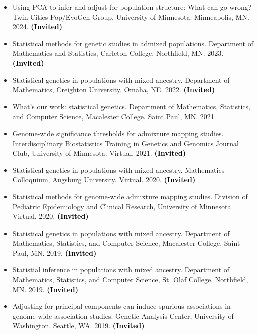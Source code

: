 \documentclass[margin]{res}
\newcommand{\annotate}[1]{\textcolor{black}{\textbf{(#1)}}}
\begin{document}
\begin{resume}
\begin{itemize}
\item[24.] Using PCA to infer and adjust for population structure: What can go wrong? 
Twin Cities Pop/EvoGen Group, University of Minnesota. Minneapolis, MN. 2024. 
\annotate{Invited}

\item[23.] Statistical methods for genetic studies in admixed populations. 
Department of Mathematics and Statistics, Carleton College. Northfield, MN. 2023. 
\annotate{Invited}

\item[22.] Statistical genetics in populations with mixed ancestry. 
Department of Mathematics, Creighton University. Omaha, NE. 2022. 
\annotate{Invited}

\item[21.] What's our work: statistical genetics. 
Department of Mathematics, Statistics, and Computer Science, Macalester College. Saint Paul, MN. 2021.

\item[20.] Genome-wide significance thresholds for admixture mapping studies.
Interdisciplinary Biostatistics Training in Genetics and Genomics Journal Club, University of Minnesota. Virtual. 2021. 
\annotate{Invited}

\item[19.] Statistical genetics in populations with mixed ancestry. 
Mathematics Colloquium, Augsburg University. Virtual. 2020. 
\annotate{Invited}

\item[18.] Statistical methods for genome-wide admixture mapping studies. 
Division of Pediatric Epidemiology and Clinical Research, University of Minnesota. Virtual. 2020. 
\annotate{Invited}

\item[17.] Statistical genetics in populations with mixed ancestry. 
Department of Mathematics, Statistics, and Computer Science, Macalester College. Saint Paul, MN. 2019. 
\annotate{Invited}

\item[16.] Statistial inference in populations with mixed ancestry. 
Department of Mathematics, Statistics, and Computer Science, St. Olaf College. Northfield, MN. 2019. 
\annotate{Invited}

\item[15.] Adjusting for principal components can induce spurious associations in genome-wide association studies. 
Genetic Analysis Center, University of Washington. Seattle, WA. 2019. 
\annotate{Invited}


\end{itemize}
\end{resume}
\end{document}
